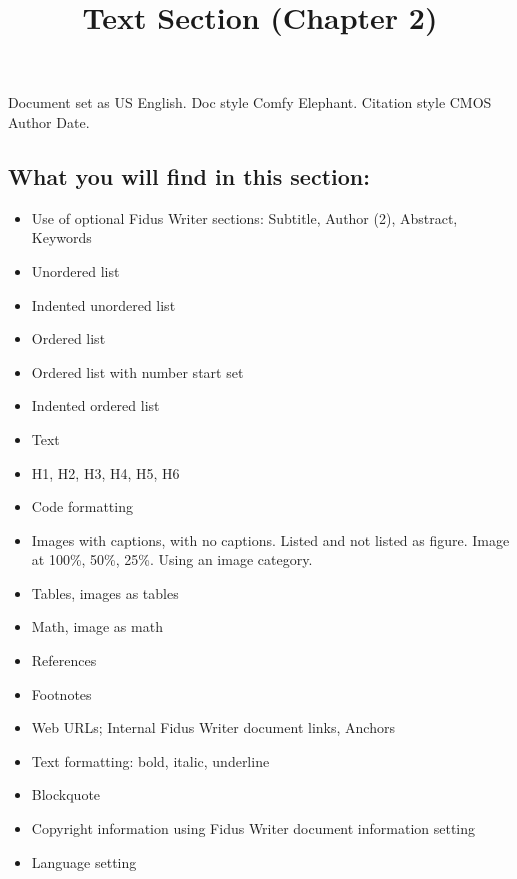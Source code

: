 \documentclass{article}
\begin{document}
\title{Text Section (Chapter 2)}

\maketitle


Document set as US English. Doc style Comfy Elephant. Citation style CMOS Author Date.


\subsection{What you will find in this section:}\label{H1003956}


\begin{itemize}
\item Use of optional Fidus Writer sections: Subtitle, Author (2), Abstract, Keywords


\item Unordered list


\item Indented unordered list


\item Ordered list


\item Ordered list with number start set


\item Indented ordered list


\item Text


\item H1, H2, H3, H4, H5, H6


\item Code formatting


\item Images with captions, with no captions. Listed and not listed as figure. Image at 100\%, 50\%, 25\%. Using an image category.


\item Tables, images as tables


\item Math, image as math


\item References


\item Footnotes


\item Web URLs; Internal Fidus Writer document links, Anchors


\item Text formatting: bold, italic, underline


\item Blockquote


\item Copyright information using Fidus Writer document information setting


\item Language setting


\end{itemize}
\end{document}
